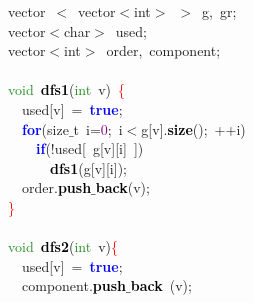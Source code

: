 {\ttfamily \raggedright {
\noindent
\mbox{}vector\ \textcolor{BrickRed}{$<$}\ \textcolor{TealBlue}{vector$<$int$>$\ $>$}\ g\textcolor{BrickRed}{,}\ gr\textcolor{BrickRed}{;} \\
\mbox{}\textcolor{TealBlue}{vector$<$char$>$}\ used\textcolor{BrickRed}{;} \\
\mbox{}\textcolor{TealBlue}{vector$<$int$>$}\ order\textcolor{BrickRed}{,}\ component\textcolor{BrickRed}{;} \\
\mbox{}\  \\
\mbox{}\textcolor{ForestGreen}{void}\ \textbf{\textcolor{Black}{dfs1}}\textcolor{BrickRed}{(}\textcolor{ForestGreen}{int}\ v\textcolor{BrickRed}{)}\ \textcolor{Red}{\{} \\
\mbox{}\ \ used\textcolor{BrickRed}{[}v\textcolor{BrickRed}{]}\ \textcolor{BrickRed}{=}\ \textbf{\textcolor{Blue}{true}}\textcolor{BrickRed}{;} \\
\mbox{}\ \ \textbf{\textcolor{Blue}{for}}\textcolor{BrickRed}{(}\textcolor{TealBlue}{size$\_$t}\ i\textcolor{BrickRed}{=}\textcolor{Purple}{0}\textcolor{BrickRed}{;}\ i\textcolor{BrickRed}{$<$}g\textcolor{BrickRed}{[}v\textcolor{BrickRed}{].}\textbf{\textcolor{Black}{size}}\textcolor{BrickRed}{();}\ \textcolor{BrickRed}{++}i\textcolor{BrickRed}{)} \\
\mbox{}\ \ \ \ \textbf{\textcolor{Blue}{if}}\textcolor{BrickRed}{(!}used\textcolor{BrickRed}{[}\ g\textcolor{BrickRed}{[}v\textcolor{BrickRed}{][}i\textcolor{BrickRed}{]}\ \textcolor{BrickRed}{])} \\
\mbox{}\ \ \ \ \ \ \textbf{\textcolor{Black}{dfs1}}\textcolor{BrickRed}{(}g\textcolor{BrickRed}{[}v\textcolor{BrickRed}{][}i\textcolor{BrickRed}{]);} \\
\mbox{}\ \ order\textcolor{BrickRed}{.}\textbf{\textcolor{Black}{push$\_$back}}\textcolor{BrickRed}{(}v\textcolor{BrickRed}{);} \\
\mbox{}\textcolor{Red}{\}} \\
\mbox{}\  \\
\mbox{}\textcolor{ForestGreen}{void}\ \textbf{\textcolor{Black}{dfs2}}\textcolor{BrickRed}{(}\textcolor{ForestGreen}{int}\ v\textcolor{BrickRed}{)}\textcolor{Red}{\{} \\
\mbox{}\ \ used\textcolor{BrickRed}{[}v\textcolor{BrickRed}{]}\ \textcolor{BrickRed}{=}\ \textbf{\textcolor{Blue}{true}}\textcolor{BrickRed}{;} \\
\mbox{}\ \ component\textcolor{BrickRed}{.}\textbf{\textcolor{Black}{push$\_$back}}\ \textcolor{BrickRed}{(}v\textcolor{BrickRed}{);} \\
}}

